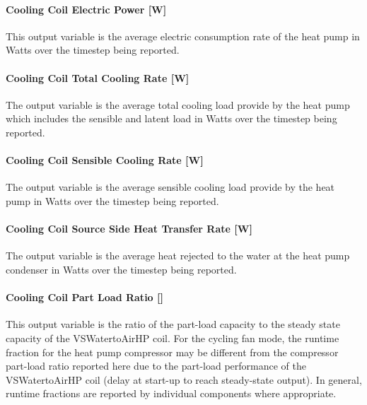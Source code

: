 \paragraph{Cooling Coil Electric Power {[}W{]}}\label{cooling-coil-electric-power-w-3}

This output variable is the average electric consumption rate of the heat pump in Watts over the timestep being reported.

\paragraph{Cooling Coil Total Cooling Rate {[}W{]}}\label{cooling-coil-total-cooling-rate-w-9}

The output variable is the average total cooling load provide by the heat pump which includes the sensible and latent load in Watts over the timestep being reported.

\paragraph{Cooling Coil Sensible Cooling Rate {[}W{]}}\label{cooling-coil-sensible-cooling-rate-w-9}

The output variable is the average sensible cooling load provide by the heat pump in Watts over the timestep being reported.

\paragraph{Cooling Coil Source Side Heat Transfer Rate {[}W{]}}\label{cooling-coil-source-side-heat-transfer-rate-w-2}

The output variable is the average heat rejected to the water at the heat pump condenser in Watts over the timestep being reported.

\paragraph{\texorpdfstring{Cooling Coil Part Load Ratio {[]}}{Cooling Coil Part Load Ratio }}\label{cooling-coil-part-load-ratio-2}

This output variable is the ratio of the part-load capacity to the steady state capacity of the VSWatertoAirHP coil. For the cycling fan mode, the runtime fraction for the heat pump compressor may be different from the compressor part-load ratio reported here due to the part-load performance of the VSWatertoAirHP coil (delay at start-up to reach steady-state output). In general, runtime fractions are reported by individual components where appropriate.

